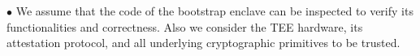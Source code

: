 
\vspace{2pt}\noindent$\bullet$ We assume that the code of the bootstrap enclave can be inspected to verify its functionalities and correctness.  Also we consider the TEE hardware, its attestation protocol, and all underlying cryptographic primitives to be trusted.  






    
    
